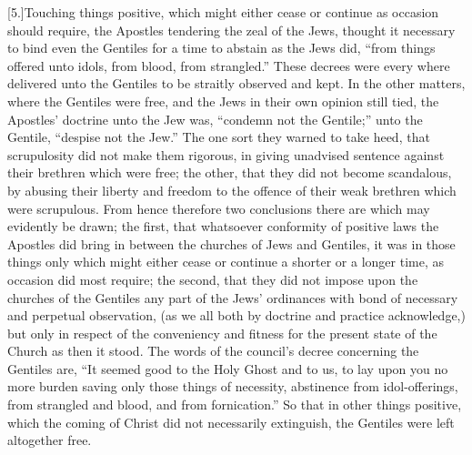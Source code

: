 [5.]Touching things positive, which might either cease or continue as occasion should require, the Apostles tendering the zeal of the Jews, thought it necessary to bind even the Gentiles for a time to abstain as the Jews did, “from things offered unto idols, from blood, from strangled.” These decrees were every where delivered unto the Gentiles to be straitly observed and kept. In the other matters, where the Gentiles were free, and the Jews in their own opinion still tied, the Apostles’ doctrine unto the Jew was, “condemn not the Gentile;” unto the Gentile, “despise not the Jew.” The one sort they warned to take heed, that scrupulosity did not make them rigorous, in giving unadvised sentence against their brethren which were free; the other, that they did not become scandalous, by abusing their liberty and freedom to the offence of their weak brethren which were scrupulous. From hence therefore two conclusions there are which may evidently be drawn; the first, that whatsoever conformity of  positive laws the Apostles did bring in between the churches of Jews and Gentiles, it was in those things only which might either cease or continue a shorter or a longer time, as occasion did most require; the second, that they did not impose upon the churches of the Gentiles any part of the Jews’ ordinances with bond of necessary and perpetual observation, (as we all both by doctrine and practice acknowledge,) but only in respect of the conveniency and fitness for the present state of the Church as then it stood. The words of the council’s decree concerning the Gentiles are, “It seemed good to the Holy Ghost and to us, to lay upon you no more burden saving only those things of necessity, abstinence from idol-offerings, from strangled and blood, and from fornication.” So that in other things positive, which the coming of Christ did not necessarily extinguish, the Gentiles were left altogether free.

